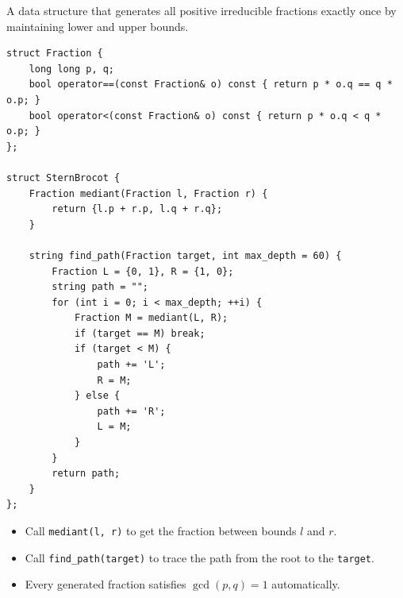 
A data structure that generates all positive irreducible fractions exactly once by maintaining lower and upper bounds.

\begin{lstlisting}
struct Fraction {
    long long p, q;
    bool operator==(const Fraction& o) const { return p * o.q == q * o.p; }
    bool operator<(const Fraction& o) const { return p * o.q < q * o.p; }
};

struct SternBrocot {
    Fraction mediant(Fraction l, Fraction r) {
        return {l.p + r.p, l.q + r.q};
    }

    string find_path(Fraction target, int max_depth = 60) {
        Fraction L = {0, 1}, R = {1, 0};
        string path = "";
        for (int i = 0; i < max_depth; ++i) {
            Fraction M = mediant(L, R);
            if (target == M) break;
            if (target < M) {
                path += 'L';
                R = M;
            } else {
                path += 'R';
                L = M;
            }
        }
        return path;
    }
};
\end{lstlisting}

\begin{itemize}
    \item Call \lstinline|mediant(l, r)| to get the fraction between bounds $l$ and $r$.
    \item Call \lstinline|find_path(target)| to trace the path from the root to the \lstinline|target|.
    \item Every generated fraction satisfies $\gcd(p, q) = 1$ automatically.
\end{itemize}
